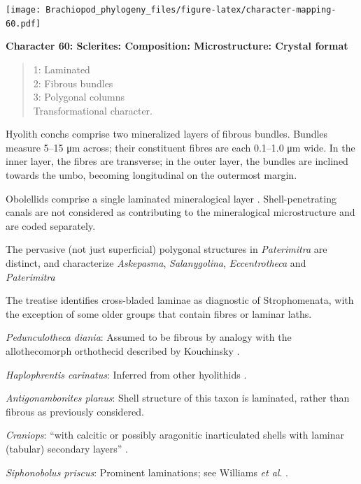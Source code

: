 \documentclass[openany]{book}
\theoremstyle{definition}
\theoremstyle{definition}
\theoremstyle{definition}
\theoremstyle{remark}
\begin{document}
\texttt{[image: Brachiopod\_phylogeny\_files/figure-latex/character-mapping-60.pdf]}

\textbf{Character 60: Sclerites: Composition: Microstructure: Crystal
format}

\begin{quote}
1: Laminated\\
2: Fibrous bundles\\
3: Polygonal columns\\
Transformational character.
\end{quote}

Hyolith conchs comprise two mineralized layers of fibrous bundles.
Bundles measure 5--15 μm across; their constituent fibres are each
0.1--1.0 μm wide. In the inner layer, the fibres are transverse; in the
outer layer, the bundles are inclined towards the umbo, becoming
longitudinal on the outermost margin.

Obolellids comprise a single laminated mineralogical layer
\citep{Balthasar2008iMummpikia}. Shell-penetrating canals are not
considered as contributing to the mineralogical microstructure and are
coded separately.

The pervasive (not just superficial) polygonal structures in
\emph{Paterimitra} are distinct, and characterize \emph{Askepasma},
\emph{Salanygolina}, \emph{Eccentrotheca} and \emph{Paterimitra}
\citep{Larsson2014iPaterimitra}

The treatise \citep{Williams2000BrachiopodaLinguliformea} identifies
cross-bladed laminae as diagnostic of Strophomenata, with the exception
of some older groups that contain fibres or laminar laths.

\emph{Pedunculotheca diania}: Assumed to be fibrous by analogy with the
allothecomorph orthothecid described by Kouchinsky
\citeyearpar{Kouchinsky2000Skeletalmicrostructures}.

\emph{Haplophrentis carinatus}: Inferred from other hyolithids
\citep[e.g.][]{Moore2018Plywoodlike}.

\emph{Antigonambonites planus}: Shell structure of this taxon is
laminated, rather than fibrous as previously considered.

\emph{Craniops}: ``with calcitic or possibly aragonitic inarticulated
shells with laminar (tabular) secondary layers''
\citep{Williams2000BrachiopodaLinguliformea}.

\emph{Siphonobolus priscus}: Prominent laminations; see Williams
\emph{et al}. \citeyearpar{Williams2004Chemicostructure}.
\end{document}
